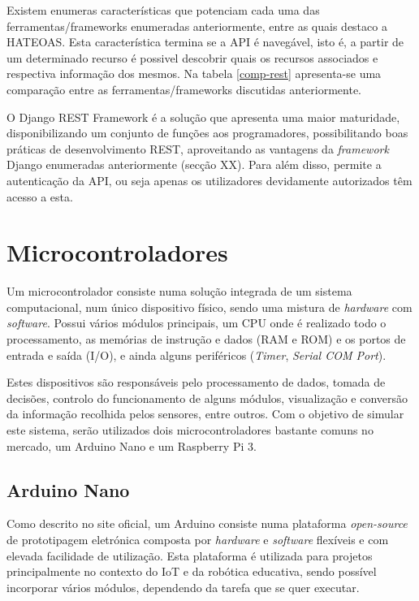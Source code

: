 Existem enumeras características que potenciam cada uma das ferramentas/frameworks enumeradas anteriormente, entre as quais destaco a \ac{HATEOAS}. Esta característica termina se a API é  navegável, isto é, a partir de um determinado recurso é possivel descobrir quais os recursos associados e respectiva informação dos mesmos. Na tabela \ref{comp-rest} apresenta-se uma comparação entre as ferramentas/frameworks discutidas anteriormente. 


O Django REST Framework é a solução que apresenta uma maior maturidade, disponibilizando um conjunto de funções aos programadores, possibilitando boas práticas de desenvolvimento \ac{REST}, aproveitando as vantagens da \textit{framework} Django enumeradas anteriormente (secção XX). Para além disso, permite a autenticação da API, ou seja apenas os utilizadores devidamente autorizados têm acesso a esta.   









\section{Microcontroladores}


Um microcontrolador consiste numa solução integrada de um sistema computacional, num único dispositivo físico, sendo uma mistura de \textit{hardware} com \textit{software}. Possui vários módulos principais, um \ac{CPU} onde é realizado todo o processamento, as memórias de instrução e dados (\ac{RAM} e \ac{ROM}) e os portos de entrada e saída (\ac{I/O}), e ainda alguns periféricos (\textit{Timer}, \textit{Serial COM Port}). 

Estes dispositivos são responsáveis pelo processamento de dados, tomada de decisões, controlo do funcionamento de alguns módulos, visualização e conversão da informação recolhida pelos sensores, entre outros. Com o objetivo de simular este sistema, serão utilizados dois microcontroladores bastante comuns no mercado, um Arduino Nano e um Raspberry Pi 3.  


\subsection{Arduino Nano}


Como descrito no site oficial, um Arduino consiste numa plataforma \textit{open-source} de prototipagem eletrónica composta por \textit{hardware} e \textit{software} flexíveis e com elevada facilidade de utilização. Esta plataforma é utilizada para projetos principalmente no contexto do \ac{IoT} e da robótica educativa, sendo possível incorporar vários módulos, dependendo da tarefa que se quer executar\cite{Banzi2012}. 


